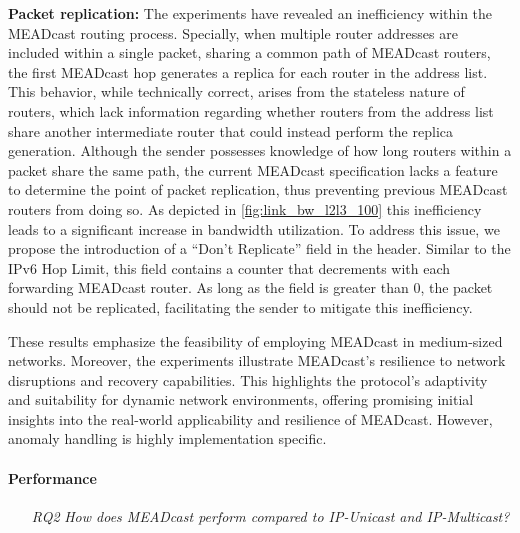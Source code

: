 \begin{itemize}
    \textbf{Packet replication:}
    The experiments have revealed an inefficiency within the MEADcast routing
        process.
    Specially, when multiple router addresses are included within a single
        packet, sharing a common path of MEADcast routers, the first MEADcast
        hop generates a replica for each router in the address list.
    This behavior, while technically correct, arises from the stateless nature
        of routers, which lack information regarding whether routers from the
        address list share another intermediate router that could instead
        perform the replica generation.
    Although the sender possesses knowledge of how long routers within a packet
        share the same path, the current MEADcast specification lacks a feature
        to determine the point of packet replication, thus preventing previous
        MEADcast routers from doing so.
    As depicted in \autoref{fig:link_bw_l2l3_100} this inefficiency leads to a
        significant increase in bandwidth utilization.
    To address this issue, we propose the introduction of a ``Don't Replicate''
        field in the header.
    Similar to the IPv6 Hop Limit, this field contains a counter that
        decrements with each forwarding MEADcast router.
    As long as the field is greater than 0, the packet should not be
        replicated, facilitating the sender to mitigate this inefficiency.

    These results emphasize the feasibility of employing MEADcast in
        medium-sized networks.
    Moreover, the experiments illustrate MEADcast's resilience to network
        disruptions and recovery capabilities.
    This highlights the protocol's adaptivity and suitability for dynamic
        network environments, offering promising initial insights into the
        real-world applicability and resilience of MEADcast.
    However, anomaly handling is highly implementation specific.
\end{itemize}

\paragraph{Performance} %
\label{par:discussion_Performance}
\begin{itemize}
\item[\textit{RQ2}]
    \textit{How does MEADcast perform compared to IP-Unicast and IP-Multicast?}
    
\end{itemize}

